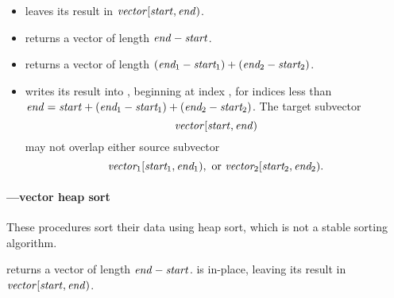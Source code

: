 \begin{itemize}
\item 
{} leaves its result in
\(\var{vector}[\var{start},\var{end})\).
\item   
{} returns a vector of length
\(\var{end}-\var{start}\).
\item 
{} returns a vector of length
\((\var{end$_1$}-\var{start$_1$})+(\var{end$_2$}-\var{start$_2$})\).
\item 
{} writes its result into , beginning
at index ,
for indices less than \(\var{end} =\var{start} +
(\var{end$_1$}-\var{start$_1$}) + (\var{end$_2$}-\var{start$_2$})\).
The target subvector
\[\var{vector}[\var{start},\var{end})\]
may not overlap either source subvector
\[\var{vector$_1$}[\var{start$_1$},\var{end$_1$}), \textrm{ or }
\var{vector$_2$}[\var{start$_2$},\var{end$_2$}).\]
\end{itemize}

\paragraph{---vector heap sort}

\begin{protos}
\end{protos}
%
These procedures sort their data using heap sort, 
which is not a stable sorting algorithm.
    
 returns a vector of length \(\var{end}-\var{start}\). 
 is in-place, leaving its result in
\(\var{vector}[\var{start},\var{end})\).


    


